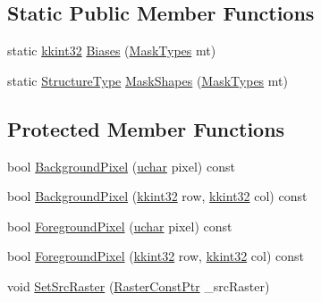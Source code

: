 \subsection*{Static Public Member Functions}
\begin{DoxyCompactItemize}
\item 
static \hyperlink{namespace_k_k_b_a8fa4952cc84fda1de4bec1fbdd8d5b1b}{kkint32} \hyperlink{class_k_k_b_1_1_morph_op_affa9101a819e7103df69c8851cd7e920}{Biases} (\hyperlink{class_k_k_b_1_1_morph_op_a9eaa0383bf9e046da208af397e7e35eb}{Mask\+Types} mt)
\item 
static \hyperlink{class_k_k_b_1_1_morph_op_a09e4aff7e81327849855ff72082d85b3}{Structure\+Type} \hyperlink{class_k_k_b_1_1_morph_op_a7e477ebbb2c0cdd67388cb841685c02b}{Mask\+Shapes} (\hyperlink{class_k_k_b_1_1_morph_op_a9eaa0383bf9e046da208af397e7e35eb}{Mask\+Types} mt)
\end{DoxyCompactItemize}
\subsection*{Protected Member Functions}
\begin{DoxyCompactItemize}
\item 
bool \hyperlink{class_k_k_b_1_1_morph_op_a300c5117659d224d78f7b5a8d44ded91}{Background\+Pixel} (\hyperlink{namespace_k_k_b_ace9969169bf514f9ee6185186949cdf7}{uchar} pixel) const 
\item 
bool \hyperlink{class_k_k_b_1_1_morph_op_ab53f856a19c951a50178873c23bd5dd6}{Background\+Pixel} (\hyperlink{namespace_k_k_b_a8fa4952cc84fda1de4bec1fbdd8d5b1b}{kkint32} row, \hyperlink{namespace_k_k_b_a8fa4952cc84fda1de4bec1fbdd8d5b1b}{kkint32} col) const 
\item 
bool \hyperlink{class_k_k_b_1_1_morph_op_acd5541050c3c0207b004b71caf7fb1f4}{Foreground\+Pixel} (\hyperlink{namespace_k_k_b_ace9969169bf514f9ee6185186949cdf7}{uchar} pixel) const 
\item 
bool \hyperlink{class_k_k_b_1_1_morph_op_ac3ac8faa16c12502d2b7c50b79cedfe8}{Foreground\+Pixel} (\hyperlink{namespace_k_k_b_a8fa4952cc84fda1de4bec1fbdd8d5b1b}{kkint32} row, \hyperlink{namespace_k_k_b_a8fa4952cc84fda1de4bec1fbdd8d5b1b}{kkint32} col) const 
\item 
void \hyperlink{class_k_k_b_1_1_morph_op_a07c75e151d9b95ca13da3bfc2e48dba4}{Set\+Src\+Raster} (\hyperlink{namespace_k_k_b_a5acfa7402dc4df1769f90d3dc8ddfc2c}{Raster\+Const\+Ptr} \+\_\+src\+Raster)
\end{DoxyCompactItemize}
